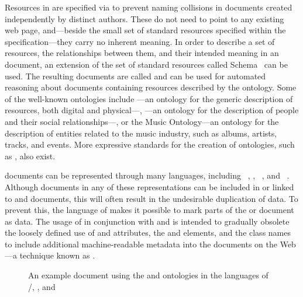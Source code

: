 Resources in  are specified via  to prevent naming
collisions in  documents created independently by distinct authors.
These  do not need to point to any existing web page, and---beside
the small set of standard resources specified within the 
specification---they carry no inherent meaning. In order to describe a set of
resources, the relationships between them, and their intended meaning in an
 document, an extension of the set of standard resources called
 Schema~\cite{brickley04} can be used. The resulting documents
are called   and can be
used for automated reasoning about  documents containing resources
described by the ontology. Some of the well-known ontologies include ---an ontology for the
generic description of resources, both digital and physical---,
---an ontology for the description of people and their social
relationships---, or the Music Ontology---an ontology for the description of
entities related to the music industry, such as albums, artists, tracks, and
events. More expressive standards for the creation of ontologies, such as
, also exist.

 documents can be represented through many languages, including
~\cite{lassira99}, ,
~\cite{beckett14:turtle}, and ~\cite{beckett14:nt}.
Although  documents in any of these representations can be
included in or linked to  and  documents, this
will often result in the undesirable duplication of data. To prevent this, the
language of  makes it possible to mark parts of the
 or  document as  data. The usage
of  in conjunction with  and  is
intended to gradually obsolete the loosely defined use of  and
 attributes, the  and  elements,
and the  class names to include additional machine-readable metadata
into the documents on the Web---a technique known as .

\begin{figure}
  \vspace{-.4em}%
  \vspace{-.4em}%
  \caption{An example  document using
    the  and  ontologies in the languages of
    /,
    , and
    }\label{fig:rdf-doc}
\end{figure}

